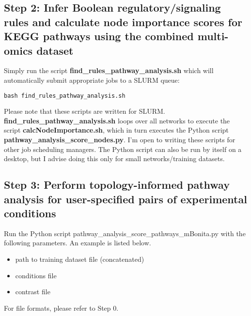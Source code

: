 \documentclass[]{article}
\providecommand{\tightlist}{%
  \setlength{\itemsep}{0pt}\setlength{\parskip}{0pt}}
\begin{document}
\hypertarget{step-2-infer-boolean-regulatorysignaling-rules-and-calculate-node-importance-scores-for-kegg-pathways-using-the-combined-multi-omics-dataset}{%
\subsection{Step 2: Infer Boolean regulatory/signaling rules and
calculate node importance scores for KEGG pathways using the combined
multi-omics
dataset}\label{step-2-infer-boolean-regulatorysignaling-rules-and-calculate-node-importance-scores-for-kegg-pathways-using-the-combined-multi-omics-dataset}}

Simply run the script \textbf{find\_rules\_pathway\_analysis.sh} which
will automatically submit appropriate jobs to a SLURM queue:

\texttt{bash\ find\_rules\_pathway\_analysis.sh}

Please note that these scripts are written for SLURM.
\textbf{find\_rules\_pathway\_analysis.sh} loops over all networks to
execute the script \textbf{calcNodeImportance.sh}, which in turn
executes the Python script \textbf{pathway\_analysis\_score\_nodes.py}.
I'm open to writing these scripts for other job scheduling managers. The
Python script can also be run by itself on a desktop, but I advise doing
this only for small networks/training datasets.

\hypertarget{step-3-perform-topology-informed-pathway-analysis-for-user-specified-pairs-of-experimental-conditions}{%
\subsection{Step 3: Perform topology-informed pathway analysis for
user-specified pairs of experimental
conditions}\label{step-3-perform-topology-informed-pathway-analysis-for-user-specified-pairs-of-experimental-conditions}}

Run the Python script pathway\_analysis\_score\_pathways\_mBonita.py
with the following parameters. An example is listed below.

\begin{itemize}
\tightlist
\item
  path to training dataset file (concatenated)
\item
  conditions file
\item
  contrast file
\end{itemize}

For file formats, please refer to Step 0.
\end{document}
